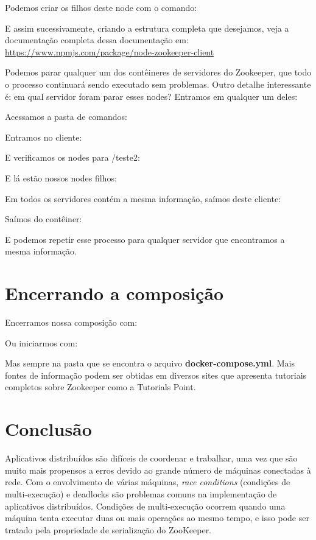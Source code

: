 \documentclass[a4paper,11pt]{article}
\begin{document}
Podemos criar os filhos deste node com o comando: \\

E assim sucessivamente, criando a estrutura completa que desejamos, veja a documentação completa dessa documentação em: \url{https://www.npmjs.com/package/node-zookeeper-client}

Podemos parar qualquer um dos contêineres de servidores do Zookeeper, que todo o processo continuará sendo executado sem problemas. Outro detalhe interessante é: em qual servidor foram parar esses nodes? Entramos em qualquer um deles: \\

Acessamos a pasta de comandos: \\

Entramos no cliente: \\

E verificamos os nodes para /teste2: \\

E lá estão nossos nodes filhos: \\

Em todos os servidores contém a mesma informação, saímos deste cliente: \\

Saímos do contêiner: \\

E podemos repetir esse processo para qualquer servidor que encontramos a mesma informação.

\section{Encerrando a composição}
Encerramos nossa composição com: \\

Ou iniciarmos com: \\

Mas sempre na pasta que se encontra o arquivo \textbf{docker-compose.yml}. Mais fontes de informação podem ser obtidas em diversos sites que apresenta tutoriais completos sobre Zookeeper como a Tutorials Point\cite{tutorialspoint}.

\section{Conclusão}
Aplicativos distribuídos são difíceis de coordenar e trabalhar, uma vez que são muito mais propensos a erros devido ao grande número de máquinas conectadas à rede. Com o envolvimento de várias máquinas, \textit{race conditions} (condições de multi-execução) e deadlocks são problemas comuns na implementação de aplicativos distribuídos. Condições de multi-execução ocorrem quando uma máquina tenta executar duas ou mais operações ao mesmo tempo, e isso pode ser tratado pela propriedade de serialização do ZooKeeper. 
\end{document}
